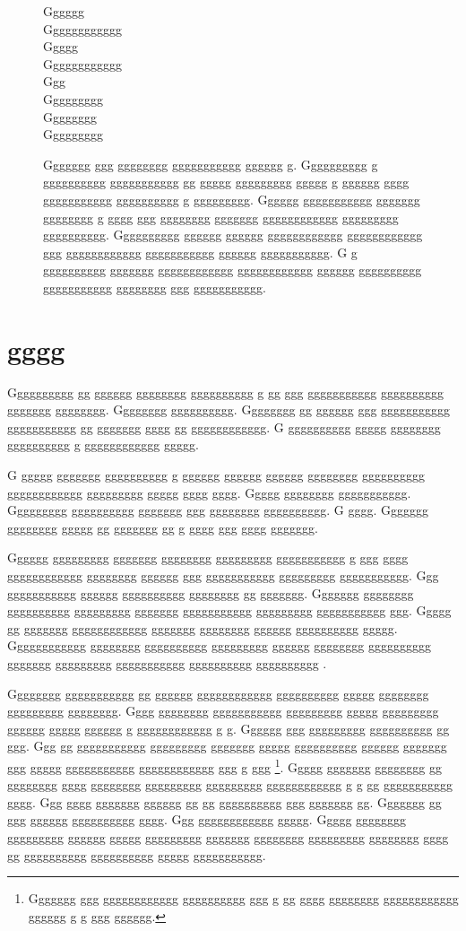 \documentclass[conference]{IEEEtran}
\begin{document}
\begin{figure}[tb]
\centering
\huge
Gggggg\\
Gggggggggggg\\
Ggggg\\
Gggggggggggg\\
Ggg\\
Ggggggggg\\
Gggggggg\\
Ggggggggg
\caption{Ggggggg ggg gggggggg ggggggggggg gggggg g.  Gggggggggg g gggggggggg ggggggggggg gg ggggg ggggggggg ggggg g gggggg gggg ggggggggggg gggggggggg g ggggggggg.  Gggggg ggggggggggg ggggggg gggggggg g gggg ggg gggggggg ggggggg gggggggggggg ggggggggg gggggggggg.  Gggggggggg gggggg gggggg gggggggggggg gggggggggggg ggg gggggggggggg ggggggggggg gggggg ggggggggggg.  G g gggggggggg ggggggg gggggggggggg gggggggggggg gggggg gggggggggg ggggggggggg gggggggg ggg ggggggggggg.}
\end{figure}

\section{gggg}

Gggggggggg gg gggggg gggggggg gggggggggg g gg ggg ggggggggggg gggggggggg ggggggg gggggggg.  Gggggggg gggggggggg.  Gggggggg gg gggggg ggg ggggggggggg ggggggggggg gg ggggggg gggg gg gggggggggggg.  G gggggggggg ggggg gggggggg gggggggggg g gggggggggggg ggggg.

G ggggg ggggggg gggggggggg g gggggg gggggg gggggg gggggggg gggggggggg gggggggggggg ggggggggg ggggg gggg gggg.  Ggggg gggggggg ggggggggggg.  Ggggggggg gggggggggg ggggggg ggg gggggggg gggggggggg.  G gggg.  Ggggggg gggggggg ggggg gg ggggggg gg g gggg ggg gggg ggggggg.

Gggggg ggggggggg ggggggg gggggggg ggggggggg ggggggggggg g ggg gggg gggggggggggg gggggggg gggggg ggg ggggggggggg ggggggggg ggggggggggg.  Ggg ggggggggggg gggggg gggggggggg gggggggg gg ggggggg.  Ggggggg gggggggg gggggggggg ggggggggg ggggggg ggggggggggg ggggggggg ggggggggggg ggg.  Ggggg gg ggggggg gggggggggggg ggggggg gggggggg gggggg gggggggggg ggggg.  Gggggggggggg gggggggg gggggggggg ggggggggg gggggg gggggggg gggggggggg ggggggg ggggggggg ggggggggggg gggggggggg gggggggggg \cite{g6}.

Gggggggg ggggggggggg gg gggggg gggggggggggg gggggggggg ggggg gggggggg ggggggggg gggggggg.  Gggg gggggggg ggggggggggg ggggggggg ggggg ggggggggg gggggg ggggg gggggg g gggggggggggg g g.  Gggggg ggg ggggggggg gggggggggg gg ggg.  Ggg gg ggggggggggg ggggggggg ggggggg ggggg gggggggggg gggggg ggggggg ggg ggggg ggggggggggg gggggggggggg ggg g ggg \footnote{Ggggggg ggg gggggggggggg gggggggggg ggg g gg gggg gggggggg gggggggggggg gggggg g g ggg gggggg.}.  Ggggg ggggggg gggggggg gg gggggggg gggg gggggggg ggggggggg ggggggggg gggggggggggg g g gg ggggggggggg gggg.  Ggg gggg ggggggg gggggg gg gg gggggggggg ggg ggggggg gg.  Ggggggg gg ggg gggggg gggggggggg gggg.  Ggg gggggggggggg ggggg.  Ggggg gggggggg ggggggggg gggggg ggggg ggggggggg ggggggg gggggggg ggggggggg gggggggg gggg gg gggggggggg gggggggggg ggggg ggggggggggg.
\end{document}
